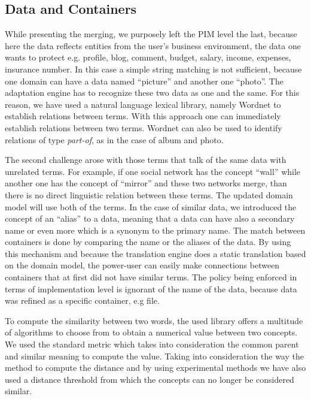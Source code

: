 \documentclass{sig-alternate}
\begin{document}
\subsection{Data and Containers}
While presenting the merging, we purposely left the PIM level the last, 
because here the data reflects entities from the user's business environment, the data one wants to protect
e.g. profile, blog, comment, budget, salary, income, expenses, insurance number.
In this case a simple string matching is not sufficient, because one domain can have a data named ``picture'' and another one ``photo''.
The adaptation engine has to recognize these two data as one and the same.
For this reason, we have used a natural language lexical library, namely Wordnet \cite{wordnet1, wordnet2, wordnet3} to establish relations between terms.
With this approach one can immediately establish relations between two terms.
Wordnet can also be used to identify relations of type \textit{part-of}, as in the case of album and photo.

The second challenge arose with those terms that talk of the same data with unrelated terms.
For example, if one social network has the concept ``wall'' while another one has the concept of ``mirror'' and these two networks merge,
than there is no direct linguistic relation between these terms. The updated domain model will use both of the terms.
In the case of similar data, we introduced the concept of an ``alias'' to a data, 
meaning that a data can have also a secondary name or even more which is a synonym to the primary name. 
The match between containers is done by comparing the name or the aliases of the data.
By using this mechanism and because the translation engine does a static translation based on the domain model,
the power-user can easily make connections between containers that at first did not have similar terms.
The policy being enforced in terms of implementation level is ignorant of the name of the data, because data was refined as a specific container, e.g file.

To compute the similarity between two words, the used library offers a multitude of algorithms to choose from to obtain a numerical value between two concepts.
We used the standard metric which takes into consideration the common parent and similar meaning to compute the value.
Taking into consideration the way the method to compute the distance and by using experimental methods we have also used a distance threshold from which the concepts can no longer be considered similar.
\end{document}
